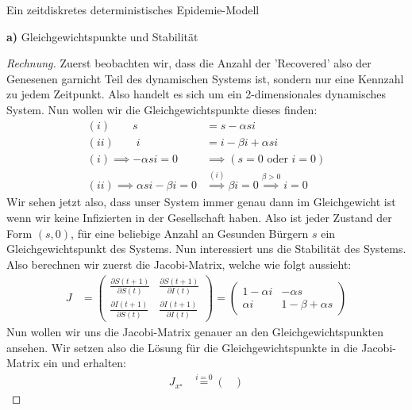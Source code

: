 \documentclass[a4paper]{article}
\newenvironment{Aufgabe}[2][Aufgabe]{\begin{trivlist}
\item[\hskip \labelsep {\bfseries #1}\hskip \labelsep {\bfseries #2.}]}{\end{trivlist}}
\begin{document}
\begin{theorem} %
\begin{Aufgabe}{22} %
	Ein zeitdiskretes deterministisches Epidemie-Modell
\end{Aufgabe}

\textbf{a)} Gleichgewichtspunkte und Stabilität

\begin{proof}[Rechnung]
	Zuerst beobachten wir, dass die Anzahl der 'Recovered' also der Genesenen garnicht Teil des
	dynamischen Systems ist, sondern nur eine Kennzahl zu jedem Zeitpunkt. Also handelt es sich
	um ein 2-dimensionales dynamisches System. Nun wollen wir die Gleichgewichtspunkte dieses finden:
	\begin{align*}
		(i) \qquad s &= s - \alpha si \\
		(ii) \qquad i &= i - \beta i + \alpha si \\
		(i) \implies - \alpha si = 0 & \implies \left(
			s = 0 \text{ oder } i = 0
		\right) \\
			(ii) \implies \alpha si - \beta i = 0 &
			\overset{(i)} \implies \beta i = 0
			\overset{\beta > 0} \implies i = 0
	\end{align*}
	Wir sehen jetzt also, dass unser System immer genau dann im Gleichgewicht ist wenn wir keine
	Infizierten in der Gesellschaft haben.
	Also ist jeder Zustand der Form $(s, 0)$, für eine beliebige Anzahl an Gesunden Bürgern $s$
	ein Gleichgewichtspunkt des Systems.
	Nun interessiert uns die Stabilität des Systems.
	Also berechnen wir zuerst die Jacobi-Matrix, welche wie folgt aussieht:
	\begin{align*}
		J &= \begin{pmatrix} 
			\frac{ \partial S(t+1) }{ \partial S(t) } &
			\frac{ \partial S(t+1) }{ \partial I(t) } \\
			\frac{ \partial I(t+1) }{ \partial S(t) } &
			\frac{ \partial I(t+1) }{ \partial I(t) }
		\end{pmatrix} 
		= \begin{pmatrix} 
			1 - \alpha i & - \alpha s \\
			\alpha i & 1 - \beta + \alpha s
		\end{pmatrix} 
	\end{align*}
	Nun wollen wir uns die Jacobi-Matrix genauer an den Gleichgewichtspunkten ansehen.
	Wir setzen also die Lösung für die Gleichgewichtspunkte in die Jacobi-Matrix ein und erhalten:
	\begin{align*}
		J_{x ^{\star}} & \overset{i = 0} = \begin{pmatrix} 

\end{pmatrix}
\end{align*}
\end{proof}
\end{theorem}
\end{document}
